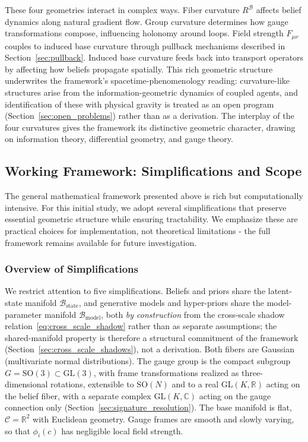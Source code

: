 \documentclass[11pt]{article}
\begin{document}
These four geometries interact in complex ways. Fiber curvature $R^\mathcal{B}$ affects belief dynamics along natural gradient flow. Group curvature determines how gauge transformations compose, influencing holonomy around loops. Field strength $F_{\mu\nu}$ couples to induced base curvature through pullback mechanisms described in Section~\ref{sec:pullback}. Induced base curvature feeds back into transport operators by affecting how beliefs propagate spatially. This rich geometric structure underwrites the framework's spacetime-phenomenology reading: curvature-like structures arise from the information-geometric dynamics of coupled agents, and identification of these with physical gravity is treated as an open program (Section~\ref{sec:open_problems}) rather than as a derivation. The interplay of the four curvatures gives the framework its distinctive geometric character, drawing on information theory, differential geometry, and gauge theory.

\subsection{Working Framework: Simplifications and Scope}
\label{sec:working_framework}

The general mathematical framework presented above is rich but computationally intensive. For this initial study, we adopt several simplifications that preserve essential geometric structure while ensuring tractability. We emphasize these are practical choices for implementation, not theoretical limitations - the full framework remains available for future investigation.

\subsubsection{Overview of Simplifications}

We restrict attention to five simplifications. Beliefs and priors share the latent-state manifold $\mathcal{B}_{\mathrm{state}}$, and generative models and hyper-priors share the model-parameter manifold $\mathcal{B}_{\mathrm{model}}$, both \emph{by construction} from the cross-scale shadow relation~\eqref{eq:cross_scale_shadow} rather than as separate assumptions; the shared-manifold property is therefore a structural commitment of the framework (Section~\ref{sec:cross_scale_shadows}), not a derivation. Both fibers are Gaussian (multivariate normal distributions). The gauge group is the compact subgroup $G = \mathrm{SO}(3) \subset \mathrm{GL}(3)$, with frame transformations realized as three-dimensional rotations, extensible to $\mathrm{SO}(N)$ and to a real $\mathrm{GL}(K, \mathbb{R})$ acting on the belief fiber, with a separate complex $\mathrm{GL}(K, \mathbb{C})$ acting on the gauge connection only (Section~\ref{sec:signature_resolution}). The base manifold is flat, $\mathcal{C} = \mathbb{R}^2$ with Euclidean geometry. Gauge frames are smooth and slowly varying, so that $\phi_i(c)$ has negligible local field strength.
\end{document}
